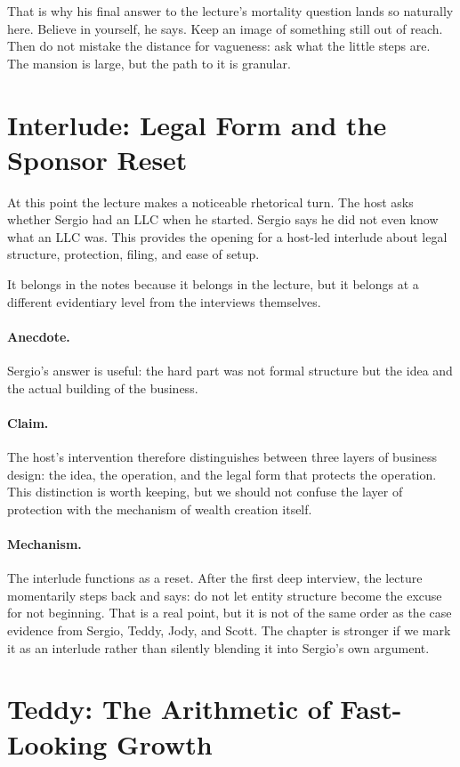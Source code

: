 That is why his final answer to the lecture's mortality question lands so naturally here. Believe in yourself, he says. Keep an image of something still out of reach. Then do not mistake the distance for vagueness: ask what the little steps are. The mansion is large, but the path to it is granular.

\section{Interlude: Legal Form and the Sponsor Reset}

At this point the lecture makes a noticeable rhetorical turn. The host asks whether Sergio had an LLC when he started. Sergio says he did not even know what an LLC was. This provides the opening for a host-led interlude about legal structure, protection, filing, and ease of setup.

It belongs in the notes because it belongs in the lecture, but it belongs at a different evidentiary level from the interviews themselves.

\paragraph{Anecdote.}
Sergio's answer is useful: the hard part was not formal structure but the idea and the actual building of the business.

\paragraph{Claim.}
The host's intervention therefore distinguishes between three layers of business design: the idea, the operation, and the legal form that protects the operation. This distinction is worth keeping, but we should not confuse the layer of protection with the mechanism of wealth creation itself.

\paragraph{Mechanism.}
The interlude functions as a reset. After the first deep interview, the lecture momentarily steps back and says: do not let entity structure become the excuse for not beginning. That is a real point, but it is not of the same order as the case evidence from Sergio, Teddy, Jody, and Scott. The chapter is stronger if we mark it as an interlude rather than silently blending it into Sergio's own argument.

\section{Teddy: The Arithmetic of Fast-Looking Growth}


